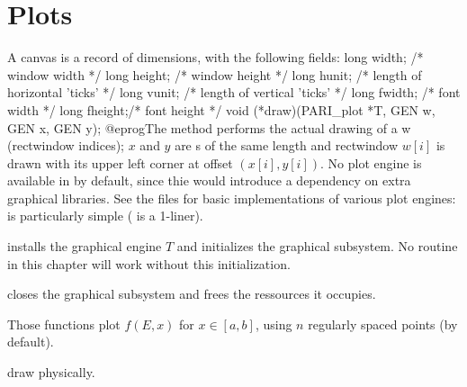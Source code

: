










\newpage

\chapter{Plots}

A  canvas is a record of dimensions, with the following fields:
\bprog
  long width;  /* window width */
  long height; /* window height */
  long hunit;  /* length of horizontal 'ticks' */
  long vunit;  /* length of vertical 'ticks' */
  long fwidth; /* font width */
  long fheight;/* font height */
  void (*draw)(PARI_plot *T, GEN w, GEN x, GEN y);
@eprog\noindent The  method performs the actual drawing of
a  w (rectwindow indices); $x$ and $y$ are s
of the same length and rectwindow $w[i]$ is drawn with its upper left
corner at offset $(x[i],y[i])$. No plot engine is available in 
by default, since thie would introduce a dependency on extra graphical
libraries. See the files  for basic implementations of
various plot engines:  is particularly simple ( is a
1-liner).

 installs the
graphical engine $T$ and initializes the graphical subsystem. No routine in
this chapter will work without this initialization.

 closes the graphical subsystem and
frees the ressources it occupies.

Those functions plot $f(E,x)$ for $x\in [a,b]$, using $n$ regularly spaced
points (by default).

 draw physically.

